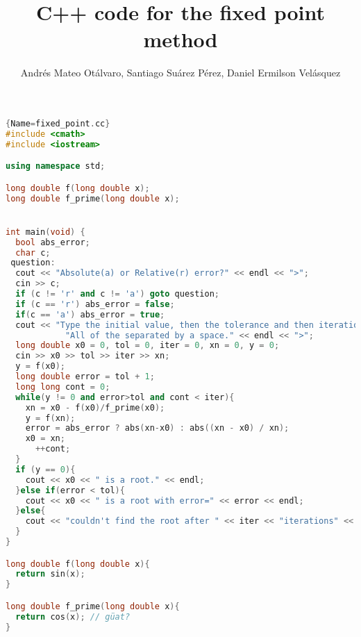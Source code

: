 \documentclass{article}
\author{Andrés Mateo Otálvaro, Santiago Suárez Pérez, Daniel Ermilson Velásquez}
\title{C++ code for the fixed point method}
\begin{document}
\maketitle
\begin{lstlisting}[language=C++, caption=Fixed point algorithm in C++]{Name=fixed_point.cc}
#include <cmath>
#include <iostream>

using namespace std;

long double f(long double x);
long double f_prime(long double x);


int main(void) {
  bool abs_error;
  char c;
 question:
  cout << "Absolute(a) or Relative(r) error?" << endl << ">";
  cin >> c;
  if (c != 'r' and c != 'a') goto question;
  if (c == 'r') abs_error = false;
  if(c == 'a') abs_error = true;
  cout << "Type the initial value, then the tolerance and then iterations."<<
            "All of the separated by a space." << endl << ">";
  long double x0 = 0, tol = 0, iter = 0, xn = 0, y = 0;
  cin >> x0 >> tol >> iter >> xn;
  y = f(x0);
  long double error = tol + 1;
  long long cont = 0;
  while(y != 0 and error>tol and cont < iter){
    xn = x0 - f(x0)/f_prime(x0);
    y = f(xn);
    error = abs_error ? abs(xn-x0) : abs((xn - x0) / xn);
    x0 = xn;
      ++cont;
  }
  if (y == 0){
    cout << x0 << " is a root." << endl;
  }else if(error < tol){
    cout << x0 << " is a root with error=" << error << endl;
  }else{
    cout << "couldn't find the root after " << iter << "iterations" << endl;
  }
}

long double f(long double x){
  return sin(x);
}

long double f_prime(long double x){
  return cos(x); // güat?
}
\end{lstlisting}
\end{document}
